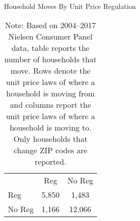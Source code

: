 \begin{table}[!htbp] \centering
\caption{Household Moves By Unit Price Regulation}
\begin{tabular}{lcc}
              & Reg   & No Reg \\
\cline{2-3}
Reg           & 5,850 & 1,483 \\
\cline{2-3}
No Reg        & 1,166 & 12,066 \\
\cline{2-3}
\end{tabular}
\caption*{Note: Based on 2004--2017 Nielsen Consumer Panel data, table reports the number of households that move. Rows denote the unit price laws of where a household is moving from and columns report the unit price laws of where a household is moving to. Only households that change ZIP codes are reported.}
\end{table}
